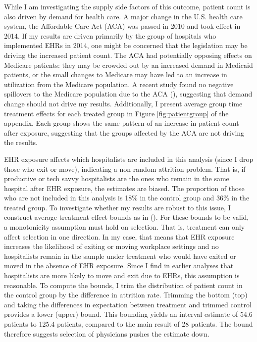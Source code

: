 \documentclass[12pt]{article}
\begin{document}
While I am investigating the supply side factors of this outcome, patient count is also driven by demand for health care. A major change in the U.S. health care system, the Affordable Care Act (ACA) was passed in 2010 and took effect in 2014. If my results are driven primarily by the group of hospitals who implemented EHRs in 2014, one might be concerned that the legislation may be driving the increased patient count. The ACA had potentially opposing effects on Medicare patients: they may be crowded out by an increased demand in Medicaid patients, or the small changes to Medicare may have led to an increase in utilization from the Medicare population. A recent study found no negative spillovers to the Medicare population due to the ACA (\cite{carey2020impact}), suggesting that demand change should not drive my results. Additionally, I present average group time treatment effects for each treated group in Figure \ref{fig:patientgroup} of the appendix. Each group shows the same pattern of an increase in patient count after exposure, suggesting that the groups affected by the ACA are not driving the results. 

EHR exposure affects which hospitalists are included in this analysis (since I drop those who exit or move), indicating a non-random attrition problem. That is, if productive or tech savvy hospitalists are the ones who remain in the same hospital after EHR exposure, the estimates are biased. The proportion of those who are not included in this analysis is 18\% in the control group and 36\% in the treated group. To investigate whether my results are robust to this issue, I construct average treatment effect bounds as in  \citeauthor{lee2009training} (\citeyear{lee2009training}). For these bounds to be valid, a monotonicity assumption must hold on selection. That is, treatment can only affect selection in one direction. In my case, that means that EHR exposure increases the likelihood of exiting or moving workplace settings and no hospitalists remain in the sample under treatment who would have exited or moved in the absence of EHR exposure. Since I find in earlier analyses that hospitalists are more likely to move and exit due to EHRs, this assumption is reasonable. To compute the bounds, I trim the distribution of patient count in the control group by the difference in attrition rate. Trimming the bottom (top) and taking the differences in expectation between treatment and trimmed control provides a lower (upper) bound. This bounding yields an interval estimate of 54.6 patients to 125.4 patients, compared to the main result of 28 patients. The bound therefore suggests selection of physicians pushes the estimate down.
\end{document}
